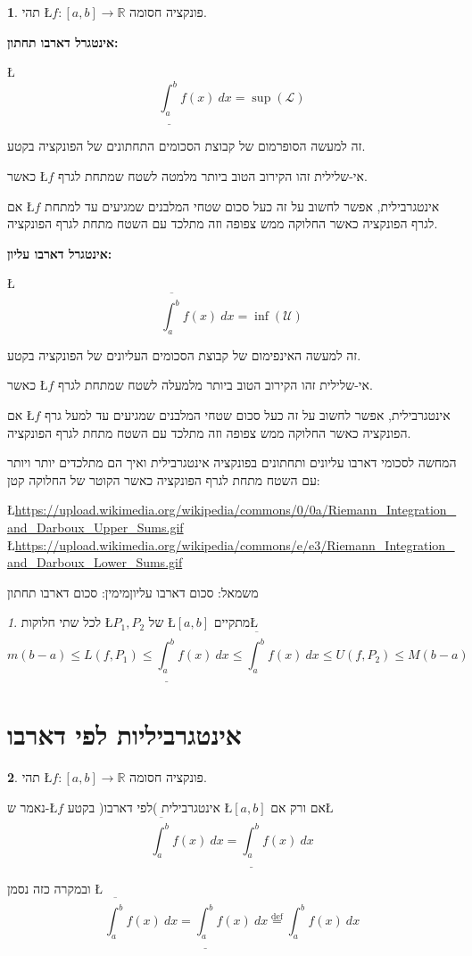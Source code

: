 \documentclass[english,hebrew]{article}
\theoremstyle{remark}
\theoremstyle{definition}
\newtheorem*{defn*}{\protect\definitionname}
\theoremstyle{plain}
\theoremstyle{remark}
\newtheorem{claim}[thm]{\protect\claimname}
\theoremstyle{plain}
\theoremstyle{plain}
\providecommand{\claimname}{טענה}
\providecommand{\definitionname}{הגדרה}
\begin{document}
\begin{defn*}
תהי \L{$f:\left[a,b\right]\rightarrow\mathbb{R}$} פונקציה חסומה.

\textbf{אינטגרל דארבו תחתון:}

\L{%
\[
\underline{\int_{a}^{b}}f(x)\ dx=\sup\left(\mathcal{L}\right)
\]
}%

זה למעשה הסופרמום של קבוצת הסכומים התחתונים של הפונקציה בקטע.

כאשר \L{$f$} אי-שלילית זהו הקירוב הטוב ביותר מלמטה לשטח שמתחת לגרף.

אם \L{$f$} אינטגרבילית, אפשר לחשוב על זה כעל סכום שטחי המלבנים שמגיעים
עד למתחת לגרף הפונקציה כאשר החלוקה ממש צפופה וזה מתלכד עם השטח מתחת
לגרף הפונקציה.

\textbf{אינטגרל דארבו עליון:}

\L{%
\[
\overline{\int_{a}^{b}}f(x)\ dx=\inf\left(\mathcal{U}\right)
\]
}%

זה למעשה האינפימום של קבוצת הסכומים העליונים של הפונקציה בקטע.

כאשר \L{$f$} אי-שלילית זהו הקירוב הטוב ביותר מלמעלה לשטח שמתחת לגרף.

אם \L{$f$} אינטגרבילית, אפשר לחשוב על זה כעל סכום שטחי המלבנים שמגיעים
עד למעל גרף הפונקציה כאשר החלוקה ממש צפופה וזה מתלכד עם השטח מתחת
לגרף הפונקציה.
\end{defn*}
המחשה לסכומי דארבו עליונים ותחתונים בפונקציה אינטגרבילית ואיך הם מתלכדים
יותר ויותר עם השטח מתחת לגרף הפונקציה כאשר הקוטר של החלוקה קטן:
\begin{center}
\L{\url{https://upload.wikimedia.org/wikipedia/commons/0/0a/Riemann_Integration_and_Darboux_Upper_Sums.gif}}
\L{\url{https://upload.wikimedia.org/wikipedia/commons/e/e3/Riemann_Integration_and_Darboux_Lower_Sums.gif}}
\par\end{center}

משמאל: סכום דארבו עליון\qquad{}מימין: סכום דארבו תחתון
\begin{claim}
לכל שתי חלוקות \L{$P_{1},P_{2}$} של \L{$\left[a,b\right]$} מתקיים\L{%
\[
m\left(b-a\right)\le L\left(f,P_{1}\right)\le\underline{\int_{a}^{b}}f(x)\ dx\le\overline{\int_{a}^{b}}f(x)\ dx\le U\left(f,P_{2}\right)\le M\left(b-a\right)
\]
}%
\end{claim}

\section{אינטגרביליות לפי דארבו}
\begin{defn*}
תהי \L{$f:\left[a,b\right]\rightarrow\mathbb{R}$} פונקציה חסומה.

נאמר ש-\L{$f$} אינטגרבילית )לפי דארבו( בקטע \L{$\left[a,b\right]$}
אם ורק אם\L{%
\[
\overline{\int_{a}^{b}}f(x)\ dx=\underline{\int_{a}^{b}}f(x)\ dx
\]
}%

ובמקרה כזה נסמן \L{%
\[
\overline{\int_{a}^{b}}f(x)\ dx=\underline{\int_{a}^{b}}f(x)\ dx\overset{\text{def}}{=}\int_{a}^{b}f(x)\ dx
\]
}%
\end{defn*}
\end{document}
